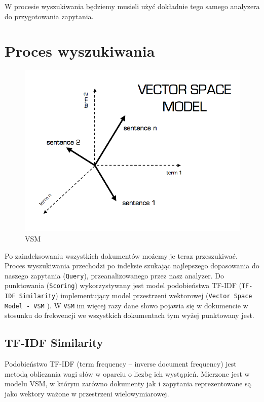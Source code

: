 \documentclass[licencjacka]{pracadypl}
\theoremstyle{definition}
\begin{document}
W procesie wyszukiwania będziemy musieli użyć dokładnie tego samego analyzera do przygotowania zapytania.


\section{Proces wyszukiwania}

\begin{figure}
	\centering
	\includegraphics[width=1\linewidth]{img/vector-space.png}
	\caption{VSM}
\end{figure}

Po zaindeksowaniu wszystkich dokumentów możemy je teraz przeszukiwać.
Proces wyszukiwania przechodzi po indeksie szukając najlepszego dopasowania do naszego zapytania (\texttt{Query}), przeanalizowanego przez nasz analyzer. 
Do punktowania (\texttt{Scoring}) wykorzystywany jest model podobieństwa TF-IDF (\texttt{TF-IDF Similarity}) implementujący model przestrzeni wektorowej (\texttt{Vector Space Model - VSM} ).
W \texttt{VSM} im więcej razy dane słowo pojawia się w dokumencie w stosunku do frekwencji we wszystkich dokumentach tym wyżej punktowany jest.

\subsection{TF-IDF Similarity}
Podobieństwo TF-IDF (term frequency – inverse document frequency) \cite{similarity-documentation} jest metodą obliczania wagi słów w oparciu o liczbę ich wystąpień. Mierzone jest w modelu VSM, w którym zarówno dokumenty jak i zapytania reprezentowane są jako wektory ważone w przestrzeni wielowymiarowej.
\end{document}
